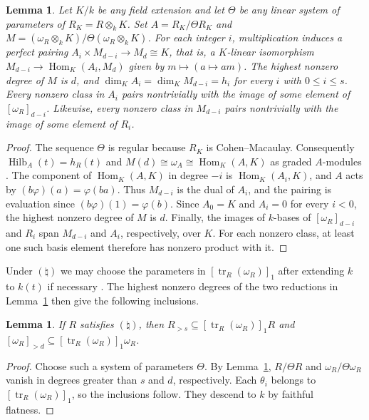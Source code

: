 \documentclass[a4paper,11pt]{amsart}
\DeclareMathOperator{\tr}{tr}
\DeclareMathOperator{\Hilb}{Hilb}
\DeclareMathOperator{\Hom}{Hom}
\newcommand{\kk}{k}
\newcommand{\natur}{\natural}
\newtheorem{lemma}[theorem]{Lemma}
\theoremstyle{definition}
\begin{document}
\begin{lemma}\label{lem:reduction-pairing}
Let $K/\kk$ be any field extension and let $\Theta$ be any linear system of parameters of $R_{K}=R\otimes_{\kk}K$. Set $A=R_{K}/\Theta R_{K}$ and $M=(\omega_R\otimes_{\kk}K)/\Theta (\omega_R\otimes_{\kk}K)$. For each integer $i$, multiplication induces a perfect pairing $A_i\times M_{d-i}\longrightarrow M_d\cong K$, that is, a $K$-linear isomorphism $M_{d-i}\to\Hom_K(A_i,M_d)$ given by $m\mapsto(a\mapsto am)$. The highest nonzero degree of $M$ is $d$, and $\dim_{K}A_i=\dim_{K}M_{d-i}=h_i$ for every $i$ with $0\le i\le s$. Every nonzero class in $A_i$ pairs nontrivially with the image of some element of $[\omega_R]_{d-i}$. Likewise, every nonzero class in $M_{d-i}$ pairs nontrivially with the image of some element of $R_i$.
\end{lemma}
\begin{proof}
The sequence $\Theta$ is regular because $R_{K}$ is Cohen--Macaulay. Consequently $\Hilb_A(t)=h_R(t)$ and $M(d)\cong\omega_A\cong\Hom_{K}(A,K)$ as graded $A$-modules \cite[Corollary~3.6.14, Theorem~3.6.19~(a), and Exercise~3.3.31]{BH98}. The component of $\Hom_K(A,K)$ in degree $-i$ is $\Hom_K(A_i,K)$, and $A$ acts by $(b\varphi)(a)=\varphi(ba)$. Thus $M_{d-i}$ is the dual of $A_i$, and the pairing is evaluation since $(b\varphi)(1)=\varphi(b)$. Since $A_0=K$ and $A_i=0$ for every $i<0$, the highest nonzero degree of $M$ is $d$. Finally, the images of $\kk$-bases of $[\omega_R]_{d-i}$ and $R_i$ span $M_{d-i}$ and $A_i$, respectively, over $K$. For each nonzero class, at least one such basis element therefore has nonzero product with it.
\end{proof}

Under $(\natur)$ we may choose the parameters in $[\tr_R(\omega_R)]_1$ after extending $\kk$ to $\kk(t)$ if necessary \cite[Remark~3.3~(1), (3), (4)]{M26}. The highest nonzero degrees of the two reductions in Lemma~\ref{lem:reduction-pairing} then give the following inclusions.

\begin{lemma}\label{lem:trace-degree-bounds}
If $R$ satisfies $(\natur)$, then $R_{>s}\subseteq[\tr_R(\omega_R)]_1R$ and $[\omega_R]_{>d}\subseteq[\tr_R(\omega_R)]_1\omega_R$.
\end{lemma}
\begin{proof}
Choose such a system of parameters $\Theta$. By Lemma~\ref{lem:reduction-pairing}, $R/\Theta R$ and $\omega_R/\Theta\omega_R$ vanish in degrees greater than $s$ and $d$, respectively. Each $\theta_i$ belongs to $[\tr_R(\omega_R)]_1$, so the inclusions follow. They descend to $\kk$ by faithful flatness.
\end{proof}
\end{document}
